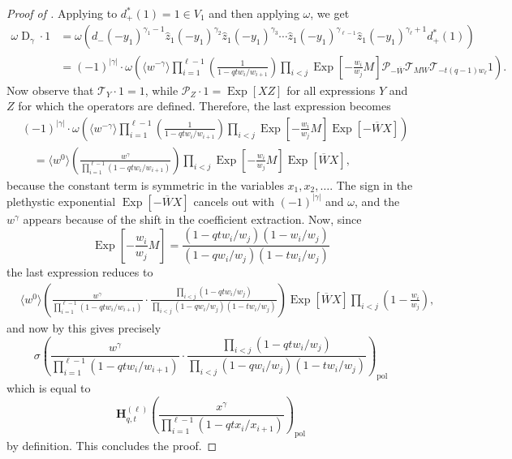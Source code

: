 \documentclass[reqno]{amsart}
\theoremstyle{plain}
\theoremstyle{definition}
\theoremstyle{remark}
\DeclareMathOperator{\D}{D}
\DeclareMathOperator{\Exp}{Exp}
\newcommand{\z}{\widehat{z}}
\newcommand{\<}{\langle}
\renewcommand{\>}{\rangle}
\begin{document}
\begin{proof}[Proof of ]
    Applying  to $d_+^*(1)=1 \in V_1$ and then applying $\omega$, we get 
    \begin{align*}
    \omega \D_\gamma \cdot 1 & = \omega \left( d_- (-y_1)^{\gamma_{1}-1} \z_1 (-y_1)^{\gamma_{2}} \z_1 (-y_1)^{\gamma_{3}} \cdots \z_1 (-y_1)^{\gamma_{\ell-1}} \z_1 (-y_1)^{\gamma_{\ell}+1} d_+^* (1) \right) \\
        & = (-1)^{\lvert \gamma \rvert} \cdot \omega \left( \langle w^{-\gamma} \rangle \prod_{i=1}^{\ell-1} \left(\frac{1}{1-qtw_{i}/w_{i+1}}\right) \prod_{i<j} \Exp\left[-\frac{w_{i}}{w_j} M\right] \mathcal{P}_{-\overline{W}}  \mathcal{T}_{MW} \mathcal{T}_{-t(q-1)w_\ell} 1 \right).
    \end{align*}
    Now observe that $\mathcal{T}_Y \cdot 1 = 1$, while $\mathcal{P}_Z \cdot 1 = \Exp[XZ]$ for all expressions $Y$ and $Z$ for which the operators are defined. Therefore, the last expression becomes
    \begin{align*}
        & (-1)^{\lvert \gamma \rvert} \cdot \omega \left( \langle w^{-\gamma} \rangle \prod_{i=1}^{\ell-1} \left(\frac{1}{1-qtw_{i}/w_{i+1}}\right) \prod_{i<j} \Exp\left[-\frac{w_{i}}{w_j} M\right] \Exp\left[-\overline{W}X\right] \right) \\
        & \quad = \langle w^0 \rangle \left(\frac{w^\gamma}{\prod_{i=1}^{\ell-1}(1-qtw_{i}/w_{i+1})}\right) \prod_{i<j}\Exp\left[-\frac{w_{i}}{w_j} M\right] \Exp\left[\overline{W}X\right],
    \end{align*}
    because the constant term is symmetric in the variables $x_1,x_2,\dots$. The sign in the plethystic exponential $\Exp[-\overline{W}X]$ cancels out with $(-1)^{\lvert \gamma \rvert}$ and $\omega$, and the $w^\gamma$ appears because of the shift in the coefficient extraction.
    Now, since
    \[ \Exp\left[-\frac{w_i}{w_j}M\right] = \frac{(1-qtw_i/w_j)(1-w_i/w_j)}{(1-qw_i/w_j)(1-tw_i/w_j)} \]
    the last expression reduces to
    \begin{align*}
        &   \langle w^0 \rangle \left(\frac{w^\gamma}{\prod_{i=1}^{\ell-1}(1-qtw_{i}/w_{i+1})} \cdot \frac{\prod_{i<j}(1-qtw_i/w_j)}{\prod_{i<j}(1-qw_i/w_j)(1-tw_i/w_j)}\right) \Exp\left[\overline{W}X\right] \prod_{i<j} \left(1-\frac{w_{i}}{w_j}\right),
    \end{align*}
    and now by  this gives precisely
    \[
        \textbf{$\sigma$} \left(\frac{w^\gamma}{\prod_{i=1}^{\ell-1}(1-qtw_{i}/w_{i+1})}\cdot \frac{\prod_{i<j}(1-qtw_i/w_j)}{\prod_{i<j}(1-qw_i/w_j)(1-tw_i/w_j)}\right)_{\text{pol}}
    \]
    which is equal to
    \[ 
        \mathbf{H}_{q,t}^{(\ell)}\left(\frac{x^\gamma}{\prod_{i=1}^{\ell-1}(1-qtx_{i}/x_{i+1})} \right)_{\mathrm{pol}}
    \]
    by definition. This concludes the proof.
\end{proof}
\end{document}
